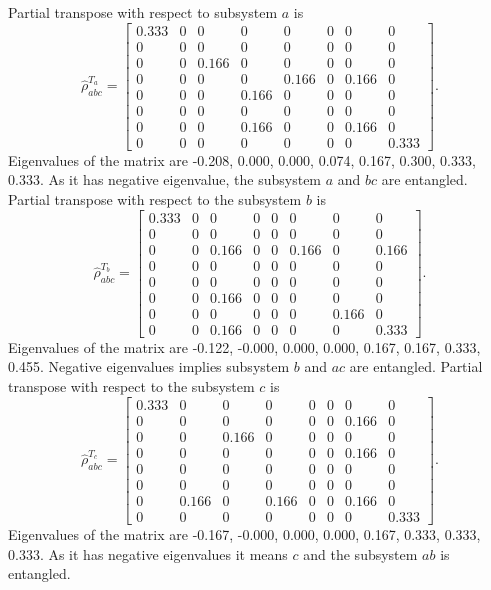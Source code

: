 \documentclass{amsart}
\theoremstyle{plain}
\theoremstyle{definition}
\theoremstyle{plain}
\begin{document}
Partial transpose with respect to subsystem $a$ is
\begin{equation*}
	\hat{\rho}_{abc}^{T_a} = \left[\begin{matrix}0.333 & 0 & 0 & 0 & 0 & 0 & 0 & 0\\0 & 0 & 0 & 0 & 0 & 0 & 0 & 0\\0 & 0 & 0.166 & 0 & 0 & 0 & 0 & 0\\0 & 0 & 0 & 0 & 0.166 & 0 & 0.166 & 0\\0 & 0 & 0 & 0.166 & 0 & 0 & 0 & 0\\0 & 0 & 0 & 0 & 0 & 0 & 0 & 0\\0 & 0 & 0 & 0.166 & 0 & 0 & 0.166 & 0\\0 & 0 & 0 & 0 & 0 & 0 & 0 & 0.333\end{matrix}\right]
	.
\end{equation*}
Eigenvalues of the matrix are -0.208, 0.000, 0.000, 0.074, 0.167, 0.300, 0.333, 0.333. As it has negative eigenvalue, the subsystem $a$ and $bc$ are entangled.
Partial transpose with respect to the subsystem $b$ is
\begin{equation*}
	\hat{\rho}_{abc}^{T_b} = \left[\begin{matrix}0.333 & 0 & 0 & 0 & 0 & 0 & 0 & 0\\0 & 0 & 0 & 0 & 0 & 0 & 0 & 0\\0 & 0 & 0.166 & 0 & 0 & 0.166 & 0 & 0.166\\0 & 0 & 0 & 0 & 0 & 0 & 0 & 0\\0 & 0 & 0 & 0 & 0 & 0 & 0 & 0\\0 & 0 & 0.166 & 0 & 0 & 0 & 0 & 0\\0 & 0 & 0 & 0 & 0 & 0 & 0.166 & 0\\0 & 0 & 0.166 & 0 & 0 & 0 & 0 & 0.333\end{matrix}\right]
	.
\end{equation*}
Eigenvalues of the matrix are -0.122, -0.000, 0.000, 0.000, 0.167, 0.167, 0.333, 0.455. Negative eigenvalues implies subsystem $b$ and $ac$ are entangled.
Partial transpose with respect to the subsystem $c$ is
\begin{equation*}
	\hat{\rho}_{abc}^{T_c} = \left[\begin{matrix}0.333 & 0 & 0 & 0 & 0 & 0 & 0 & 0\\0 & 0 & 0 & 0 & 0 & 0 & 0.166 & 0\\0 & 0 & 0.166 & 0 & 0 & 0 & 0 & 0\\0 & 0 & 0 & 0 & 0 & 0 & 0.166 & 0\\0 & 0 & 0 & 0 & 0 & 0 & 0 & 0\\0 & 0 & 0 & 0 & 0 & 0 & 0 & 0\\0 & 0.166 & 0 & 0.166 & 0 & 0 & 0.166 & 0\\0 & 0 & 0 & 0 & 0 & 0 & 0 & 0.333\end{matrix}\right].
\end{equation*}
Eigenvalues of the matrix are -0.167, -0.000, 0.000, 0.000, 0.167, 0.333, 0.333, 0.333. As it has negative eigenvalues it means $c$ and the subsystem $ab$ is entangled.
\end{document}
